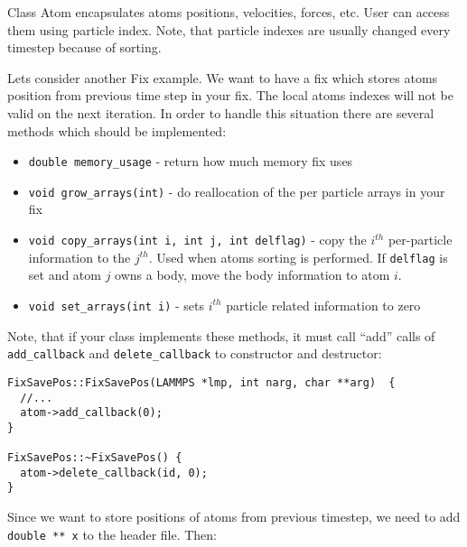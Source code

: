 \documentclass{article}
\newcommand{\code}[1]{{\color{cadetblue}\texttt{#1}}}
\begin{document}
Class Atom encapsulates atoms positions, velocities, forces, etc. User
can access them using particle index. Note, that particle indexes are
usually changed every timestep because of sorting.

Lets consider another Fix example. We want to have a fix which stores
atoms position from previous time step in your fix. The local atoms
indexes will not be valid on the next iteration. In order to handle
this situation there are several methods which should be implemented:

\begin{itemize}
\item \texttt{double memory_usage} - return how much memory fix uses
\item \texttt{void grow_arrays(int)} - do reallocation of the per particle arrays
  in your fix
\item \texttt{void copy_arrays(int i, int j, int delflag)} - copy the $i^{th}$ per-particle
  information to the $j^{th}$. Used when atoms sorting is performed. If \code{delflag} is set
  and atom $j$ owns a body, move the body information to atom $i$.
\item \texttt{void set_arrays(int i)} - sets $i^{th}$ particle related information to zero
\end{itemize}

Note, that if your class implements these methods, it must call ``add'' calls of
\code{add\_callback} and \code{delete\_callback} to constructor and destructor:

\begin{center}
\begin{verbatim}
FixSavePos::FixSavePos(LAMMPS *lmp, int narg, char **arg)  {
  //...
  atom->add_callback(0);
}

FixSavePos::~FixSavePos() {
  atom->delete_callback(id, 0);
}
\end{verbatim}
\end{center}

Since we want to store positions of atoms from previous timestep, we
need to add \texttt{double ** x} to the header file. Then:
\end{document}
